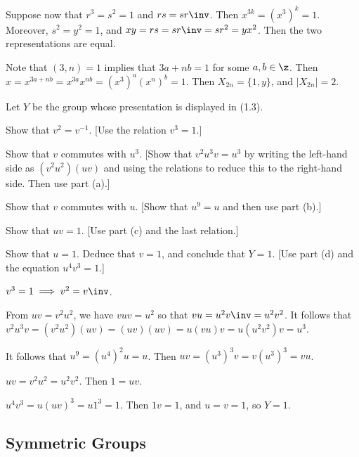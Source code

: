\begin{problems}[resume]
\begin{solalph}
        Suppose now that $r^3 = s^2 = 1$ and $rs = sr\inv$. Then $x^{3k} = (x^3)^k = 1$. Moreover, $s^2 = y^2 = 1$, and $xy = rs = sr\inv = sr^2 = yx^2$. Then the two representations are equal.
        \item Note that $(3, n) = 1$ implies that $3a + nb = 1$ for some $a, b \in \z$. Then $x = x^{3a + nb} = x^{3a}x^{nb} = (x^3)^a(x^n)^b = 1$. Then $X_{2n} = \{1, y\}$, and $|X_{2n}| = 2$.
    \end{solalph}
    \item Let $Y$ be the group whose presentation is displayed in (1.3).
    \begin{problems}
        \item Show that $v^2 = v^{-1}$. [Use the relation $v^3 = 1$.]
        \item Show that $v$ commutes with $u^3$. [Show that $v^2 u^3v = u^3$ by writing the left-hand side as $(v^2u^2)(uv)$ and using the relations to reduce this to the right-hand side. Then use part (a).]
        \item Show that $v$ commutes with $u$. [Show that $u^9 = u$ and then use part (b).]
        \item Show that $uv = 1$. [Use part (c) and the last relation.]
        \item Show that $u = 1$. Deduce that $v = 1$, and conclude that $Y = 1$. [Use part (d) and the equation $u^4 v^3 = 1$.]
    \end{problems}
    \begin{solalph}
        \item $v^3 = 1 \implies v^2 = v\inv$.
        \item From $uv = v^2u^2$, we have $vuv = u^2$ so that $vu = u^2v\inv = u^2v^2$. It follows that $v^2u^3v = (v^2u^2)(uv) = (uv)(uv) = u(vu)v = u(u^2v^2)v = u^3$.
        \item It follows that $u^9 = (u^4)^2u = u$. Then $uv = (u^3)^3v = v(u^3)^3 = vu$.
        \item $uv = v^2u^2 = u^2v^2$. Then $1 = uv$.
        \item $u^4v^3 = u(uv)^3 = u1^3 = 1$. Then $1v = 1$, and $u = v = 1$, so $Y = 1$.
    \end{solalph}
\end{problems}

\newpage

\subsection{Symmetric Groups}

